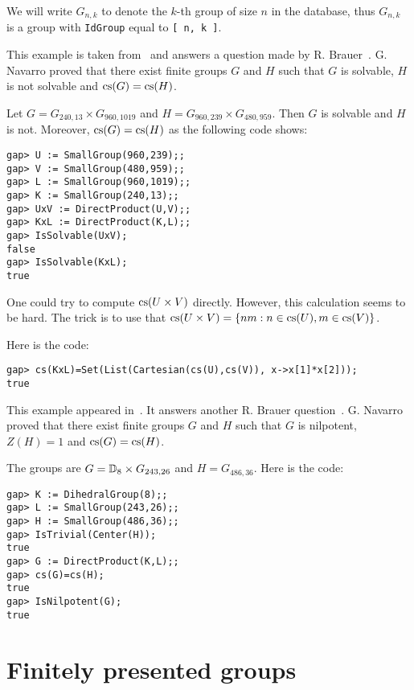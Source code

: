 We will write $G_{n,k}$ to denote the $k$-th group of size $n$ in the database,
thus $G_{n,k}$ is a group with \lstinline{IdGroup} equal to \lstinline{[ n, k ]}.

\begin{example}
  \label{example:Navarro}
	This example is taken from~\cite[Theorem A]{MR3210919} and
	answers a question made by R. Brauer~\cite[Question 2(ii)]{MR2875589}.
  G. Navarro proved that there exist finite groups $G$ and $H$ such that $G$ is
  solvable, $H$ is not solvable and $\operatorname{cs}(G)=\operatorname{cs}(H)$.

  Let $G=G_{240,13}\times G_{960,1019}$ and
  $H=G_{960,239}\times G_{480,959}$.  Then $G$ is solvable and $H$ is not. Moreover, 
  $\operatorname{cs}(G)=\operatorname{cs}(H)$ as the following code shows:
\begin{lstlisting}
gap> U := SmallGroup(960,239);;
gap> V := SmallGroup(480,959);;
gap> L := SmallGroup(960,1019);;
gap> K := SmallGroup(240,13);;
gap> UxV := DirectProduct(U,V);;
gap> KxL := DirectProduct(K,L);;
gap> IsSolvable(UxV);
false
gap> IsSolvable(KxL);
true
\end{lstlisting}
One could try to compute $\operatorname{cs}(U\times V)$ directly. However, this calculation
seems to be hard. The trick is to use that
$\operatorname{cs}(U\times V)=\{nm:n\in\operatorname{cs}(U),m\in\operatorname{cs}(V)\}$.

Here is the code:
\begin{lstlisting}
gap> cs(KxL)=Set(List(Cartesian(cs(U),cs(V)), x->x[1]*x[2]));
true
\end{lstlisting}
\end{example}

\begin{example}
This example appeared in~\cite{MR3210919}. It answers 
	another R. Brauer question~\cite[Question 4(ii)]{MR2875589}.
  G. Navarro proved that there exist finite groups $G$ and $H$ such that $G$ is
  nilpotent, $Z(H)=1$ and $\operatorname{cs}(G)=\operatorname{cs}(H)$.

  The groups are $G=\mathbb{D}_8\times G_{243,26}$ and
  $H=G_{486,36}$. Here is the code:
\begin{lstlisting}
gap> K := DihedralGroup(8);;
gap> L := SmallGroup(243,26);;
gap> H := SmallGroup(486,36);;
gap> IsTrivial(Center(H));
true
gap> G := DirectProduct(K,L);;
gap> cs(G)=cs(H);
true
gap> IsNilpotent(G);
true
\end{lstlisting}
\end{example}
	
\section{Finitely presented groups}


